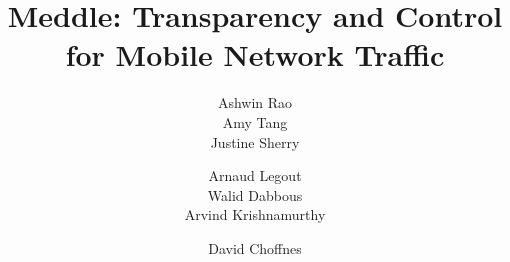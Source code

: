 \documentclass{sig-alternate-10pt}
\title{ Meddle: Transparency and Control for Mobile Network Traffic}
\author{
\alignauthor
Ashwin Rao\\
\affaddr{Inria}
\alignauthor
Amy Tang\\
\affaddr{UC Berkeley}
\alignauthor        
Justine Sherry\\
\affaddr{UC Berkeley}
\and
\alignauthor
Arnaud Legout\\
\affaddr{Inria}
\alignauthor
Walid Dabbous\\
\affaddr{Inria}
\alignauthor 
Arvind Krishnamurthy\\
\affaddr{University of Washington}
\and
\alignauthor
David Choffnes\\
\affaddr{University of Washington}
}
\date{}
\begin{document}
	
\maketitle




















\footnotesize


%
\end{document}
